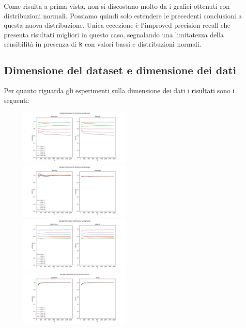 Come risulta a prima vista, non si discostano molto da i grafici ottenuti con distribuzioni normali. Possiamo quindi solo estendere le precedenti conclusioni a questa nuova distribuzione.
Unica eccezione è l'improved precision-recall che presenta risultati migliori in questo caso, segnalando una limitatezza della sensibilità in presenza di \texttt{k} con valori bassi e distribuzioni normali.

\subsection{Dimensione del dataset e dimensione dei dati}

Per quanto riguarda gli esperimenti sulla dimensione dei dati i risultati sono i seguenti:

\begin{figure}[h!]
    \includegraphics[width=0.5\textwidth]{../images/toyexperiments/ksampledim/sampleDimN_iPrecision_iRecall.png} 
    \includegraphics[width=0.5\textwidth]{../images/toyexperiments/ksampledim/sampleDimN_density_coverage.png} 
    \includegraphics[width=0.5\textwidth]{../images/toyexperiments/ksampledim/sampleDimN_pPrecision_pRecall.png} 
    \includegraphics[width=0.5\textwidth]{../images/toyexperiments/ksampledim/sampleDimN_precision_recall.png} 
\end{figure}

